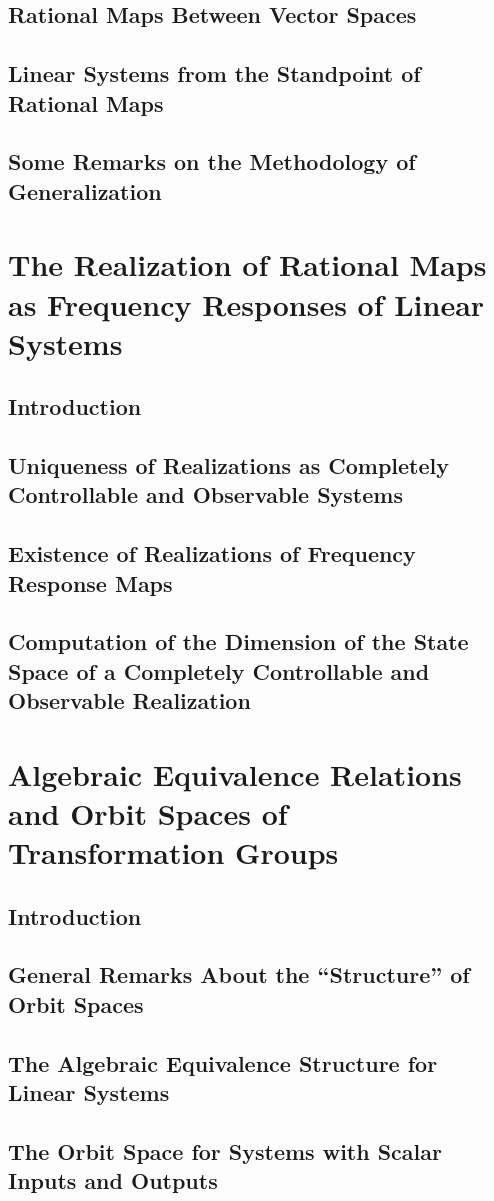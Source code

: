 \documentclass[12pt]{book}
\theoremstyle{plain}
\theoremstyle{definition}
\begin{document}
\section{Rational Maps Between Vector Spaces}

\section{Linear Systems from the Standpoint of Rational Maps}

\section{Some Remarks on the Methodology of Generalization}

\chapter{The Realization of Rational Maps as Frequency Responses of Linear Systems}

\section{Introduction}

\section{Uniqueness of Realizations as Completely Controllable and Observable Systems}

\section{Existence of Realizations of Frequency Response Maps}

\section{Computation of the Dimension of the State Space of a Completely Controllable and Observable Realization}

\chapter{Algebraic Equivalence Relations and Orbit Spaces of Transformation Groups}

\section{Introduction}

\section{General Remarks About the ``Structure'' of Orbit Spaces}

\section{The Algebraic Equivalence Structure for Linear Systems}

\section{The Orbit Space for Systems with Scalar Inputs and Outputs}

\end{document}
